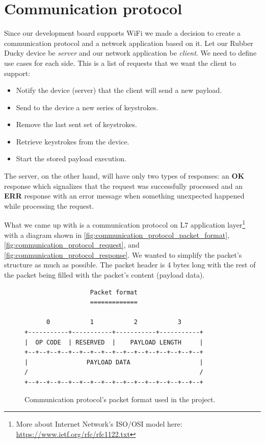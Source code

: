 \section{Communication protocol}
\label{communicationProtocol}
Since our development board supports WiFi we made a decision to create a communication protocol and a network application based on it. Let our Rubber Ducky device be \emph{server} and our network application be \emph{client}. We need to define use cases for each side. This is a list of requests that we want the client to support:
\begin{itemize}
    \item Notify the device (server) that the client will send a new payload.
    \item Send to the device a new series of keystrokes.
    \item Remove the last sent set of keystrokes.
    \item Retrieve keystrokes from the device.
    \item Start the stored payload execution.
\end{itemize}

The server, on the other hand, will have only two types of responses: an \textbf{OK} response which signalizes that the request was successfully processed and an \textbf{ERR} response with an error message when something unexpected happened while processing the request.

What we came up with is a communication protocol on L7 application layer\footnote{More about Internet Network's ISO/OSI model here: \url{https://www.ietf.org/rfc/rfc1122.txt}} with a diagram shown in \autoref{fig:communication_protocol_packet_format}, \autoref{fig:communication_protocol_request}, and \autoref{fig:communication_protocol_response}. We wanted to simplify the packet's structure as much as possible. The packet header is 4 bytes long with the rest of the packet being filled with the packet's content (payload data). 

\begin{figure}[ht]
\label{fig:communication_protocol_packet_format}
\centering
\begin{varwidth}{\linewidth}
\begin{verbatim}
                  Packet format
                  =============

      0           1           2           3      
+-----------+-----------+-----------+-----------+
|  OP CODE  | RESERVED  |    PAYLOAD LENGTH     |
+--+--+--+--+--+--+--+--+--+--+--+--+--+--+--+--+
|                PAYLOAD DATA                   |
/                                               /
+--+--+--+--+--+--+--+--+--+--+--+--+--+--+--+--+
\end{verbatim}
\end{varwidth}
\caption{Communication protocol's packet format used in the project.} 
\end{figure}

